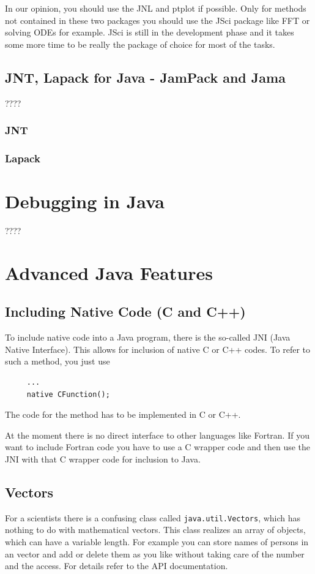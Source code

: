 In our opinion, you should use the JNL and ptplot if possible. Only for
methods not contained in these two packages you should use the
JSci package like FFT or solving ODEs for example. JSci is still in
the development phase and it takes some more time to be really
the package of choice for most of the tasks.   

\subsection{JNT, Lapack for Java - JamPack and Jama}
????
\subsubsection{JNT}
\subsubsection{Lapack}


\section{Debugging in Java}
????

\section{Advanced Java Features}

\subsection{Including Native Code (C and C++)}
To include native code into a Java program, there is the so-called
JNI (Java Native Interface). This allows for inclusion of native
C or C++ codes. To refer to such a method, you just use
\begin{verbatim}
     ...
     native CFunction();
\end{verbatim}
The code for the method has to be implemented in C or C++.

At the moment there is no direct interface to other languages like
Fortran. If you want to include Fortran code you have to use
a C wrapper code and then use the JNI with that C wrapper code
for inclusion to Java.

\subsection{Vectors}
For a scientists there is a confusing class called \verb|java.util.Vectors|, 
which has nothing to do with mathematical vectors. This class realizes
an array of objects, which can have a variable length. For example
you can store names of persons in an vector and add or delete them as
you like without taking care of the number and the access. For details
refer to the API documentation.

